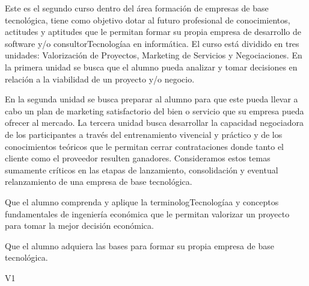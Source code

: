 \begin{syllabus}


\begin{justification}
   Este es el segundo curso dentro del área formación de empresas de base tecnológica, tiene como objetivo dotar al futuro profesional de conocimientos, actitudes y aptitudes que le permitan formar su propia empresa de desarrollo de software y/o consultorTecnologíaa en informática. El curso está dividido en tres unidades: Valorización de Proyectos, Marketing de Servicios y Negociaciones. En la primera unidad se busca que el alumno pueda analizar y tomar decisiones en relación a la viabilidad de un proyecto y/o negocio.
   
   En la segunda unidad se busca preparar al alumno para que este pueda llevar a cabo un plan de marketing satisfactorio del bien o servicio que su empresa pueda ofrecer al mercado. La tercera unidad busca desarrollar la capacidad negociadora de los participantes a través del entrenamiento vivencial y práctico y de los conocimientos teóricos que le permitan cerrar contrataciones donde tanto el cliente como el proveedor resulten ganadores. Consideramos estos temas sumamente críticos en las etapas de lanzamiento, consolidación y eventual relanzamiento de una empresa de base tecnológica.
   \end{justification}
   
   \begin{goals}
   \item Que el alumno comprenda y aplique la terminologTecnologíaa y conceptos fundamentales de ingeniería económica que le permitan valorizar un proyecto para tomar la mejor decisión económica.
   \item Que el alumno adquiera las bases para formar su propia empresa de base tecnológica.
   \end{goals}
   
   \begin{outcomes}{V1}
      \item {}
      \item {}
      \item {}
   \end{outcomes}
   

\end{syllabus}
